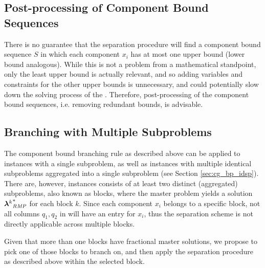 \subsection{Post-processing of Component Bound Sequences}\label{sec:cmpbnd_separation_postprocessing}
There is no guarantee that the separation procedure will find a component bound sequence $S$ in which each component $x_i$ has at most one upper bound (lower bound analogous). While this is not a problem from a mathematical standpoint, only the least upper bound is actually relevant, and so adding variables and constraints for the other upper bounds is unnecessary, and could potentially slow down the solving process of the \SP{}. Therefore, post-processing of the component bound sequences, i.e. removing redundant bounds, is advisable.


\subsection{Branching with Multiple Subproblems}\label{sec:cmpbnd_separation_branching}
The component bound branching rule as described above can be applied to instances with a single subproblem, as well as instances with multiple identical subproblems aggregated into a single subproblem (see Section \ref{sec:cg_bp_idsp}). There are, however, instances consists of at least two distinct (aggregated) subproblems, also known as blocks, where the master problem yields a solution ${{\bm{\lambda}}^k}^*_{\textit{RMP}}{}$ for each block $k$. Since each component $x_i$ belongs to a specific block, not all columns $q_1, q_2$ in \RMP{} will have an entry for $x_i$, thus the separation scheme is not directly applicable across multiple blocks.

Given that more than one blocks have fractional master solutions, we propose to pick one of those blocks to branch on, and then apply the separation procedure as described above within the selected block.
